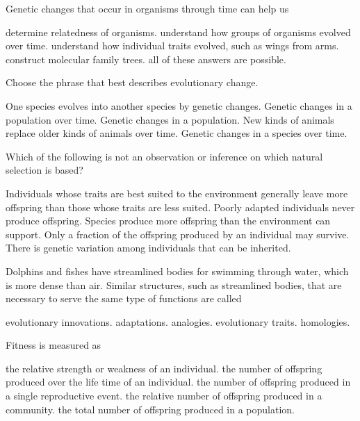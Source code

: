 \newpage

\question
Genetic changes that occur in organisms through time can help us

\begin{choices}
\choice determine relatedness of organisms.
\choice understand how groups of organisms evolved over time.
\choice understand how individual traits evolved, such as wings from arms.
\choice construct molecular family trees.
\correctchoice all of these answers are possible.%
\end{choices}

\question
Choose the phrase that best describes evolutionary change.

\begin{choices}
\choice One species evolves into another species by genetic changes.
\correctchoice Genetic changes in a population over time.
\choice Genetic changes in a population.
\choice New kinds of animals replace older kinds of animals over time.
\choice Genetic changes in a species over time.
\end{choices}

\question
Which of the following is not an observation or inference on which natural selection is based?

\begin{choices}
\choice Individuals whose traits are best suited to the environment generally leave more offspring than those whose traits are less suited.
\correctchoice Poorly adapted individuals never produce offspring.
\choice Species produce more offspring than the environment can support.
\choice Only a fraction of the offspring produced by an individual may survive.
\choice There is genetic variation among individuals that can be inherited.
\end{choices}

\question
Dolphins and fishes have streamlined bodies for swimming through water, which is more dense than air. Similar structures, such as streamlined bodies, that are necessary to serve the same type of functions are called

\begin{choices}
\choice evolutionary innovations.
\choice adaptations.
\correctchoice analogies.
\choice evolutionary traits.
\choice homologies.
\end{choices}

\question
Fitness is measured as

\begin{choices}
\choice the relative strength or weakness of an individual.
\correctchoice the number of offspring produced over the life time of an individual.
\choice the number of offspring produced in a single reproductive event.
\choice the relative number of offspring produced in a community.
\choice the total number of offspring produced in a population.
\end{choices}

